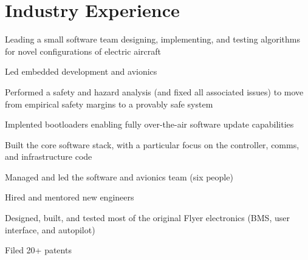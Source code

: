 \documentclass[letterpaper]{deedy-resume} %
\begin{document}
\begin{minipage}[t]{0.68\textwidth} %


\section{Industry Experience}



\vspace{\topsep} %
\begin{tightitemize}
\item Leading a small software team designing, implementing, and testing algorithms for novel configurations of electric aircraft
\end{tightitemize}

\sectionspace %


\vspace{\topsep} %
\begin{tightitemize}
\item Led embedded development and avionics
\item Performed a safety and hazard analysis (and fixed all associated issues) to move from empirical safety margins to a provably safe system
\item Implented bootloaders enabling fully over-the-air software update capabilities
\end{tightitemize}

\sectionspace %


\vspace{\topsep} %
\begin{tightitemize}
\item Built the core software stack, with a particular focus on the controller, comms, and infrastructure code
\item Managed and led the software and avionics team (six people)
\item Hired and mentored new engineers
\item Designed, built, and tested most of the original Flyer electronics (BMS, user interface, and autopilot)
\item Filed 20+ patents
\end{tightitemize}


\end{minipage}
\end{document}

